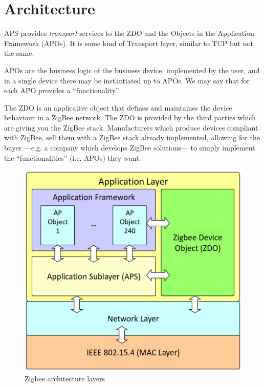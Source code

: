 \section{Architecture}

\begin{paracol}{2}
   
   
   APS provides \textit{transport} services to the ZDO and the Objects in the Application Framework (APOs). It is some kind of Transport layer, similar to TCP but not the same.
   
   APOs are the business logic of the business device, implemented by the user, and in a single device there may be instantiated up to APOs.
   We may say that for each APO provides a ``functionality''.
   
   The ZDO is an applicative object that defines and maintaines the device behaviour in a ZigBee network.
   The ZDO is provided by the third parties which are giving you the ZigBee stack.
   Manufacturers which produce devices compliant with ZigBee, sell them with a ZigBee stack already implemented, allowing for the buyer ---e.g. a company which develops ZigBee solutions--- to simply implement the ``functionalities'' (i.e. APOs) they want.
   \switchcolumn

   \begin{figure}[htbp]
      \centering
      \includegraphics{images/zigbee_architecture.png}
      \caption{Zigbee architecture layers}
      \label{fig:zigbee_architecture}
   \end{figure}
\end{paracol}

